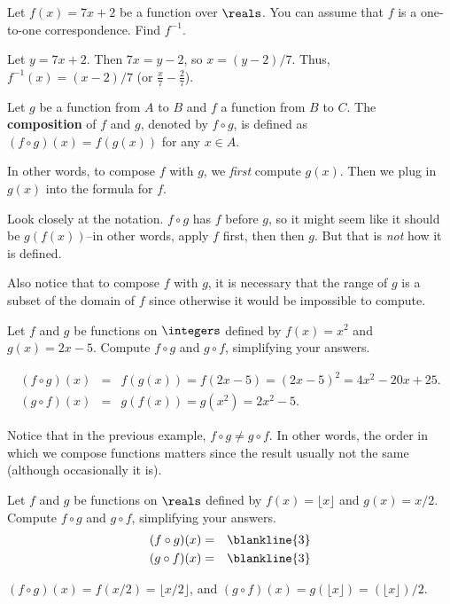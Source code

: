 \begin{exer}
Let $f(x)=7x+2$ be a function over $\reals$. 
You can assume that $f$ is a one-to-one correspondence.
Find $f^{-1}$.
\vspace*{1.25in}
\begin{answer}
Let $y=7x+2$.  Then $7x=y-2$, so $x=(y-2)/7$.  Thus, $f^{-1}(x)=(x-2)/7$
(or $\frac{x}{7}-\frac{2}{7}$).
\end{answer}
\end{exer}

\begin{df}
Let $g$ be a function from $A$ to $B$ and $f$ a function from $B$ to $C$.
The {\bf composition} of $f$ and $g$, denoted by $f\circ g$, is defined as
$(f\circ g)(x)=f(g(x))$ for any $x\in A$.
\end{df}

In other words, to compose $f$ with $g$, we {\em first} compute $g(x)$.  
Then we plug in $g(x)$ into the formula for $f$.

\begin{rem}
Look closely at the notation.  $f\circ g$ has $f$ before $g$, so it might seem like it should be
$g(f(x))$--in other words, apply $f$ first, then then $g$. But that is {\em not} how it is defined.

Also notice that to compose $f$ with $g$, it is necessary that the range of $g$ is a subset of the domain
of $f$ since otherwise it would be impossible to compute.
\end{rem}

\begin{exa}
Let $f$ and $g$ be functions on $\integers$ defined by $f(x)=x^2$ and $g(x)=2x-5$.  Compute
$f\circ g$ and $g\circ f$, simplifying your answers.
\begin{sol}
\begin{eqnarray*}
(f\circ g)(x) &=& f(g(x)) = f(2x-5) = (2x-5)^2 = 4x^2-20x+25.\\
(g\circ f)(x) &=& g(f(x)) = g(x^2) = 2x^2-5.
\end{eqnarray*}
\end{sol}
\end{exa}

Notice that in the previous example, $f\circ g \neq g\circ f$.  In other words, the order in which we
compose functions matters since the result 
usually not the same (although occasionally it is).

\begin{exer}
Let $f$ and $g$ be functions on $\reals$ defined by $f(x)=\lfloor x \rfloor$ and $g(x)=x/2$.  Compute
$f\circ g$ and $g\circ f$, simplifying your answers.
\begin{eqnarray*}
(f\circ g)(x) &=& \blankline{3}\\
(g\circ f)(x) &=& \blankline{3}
\end{eqnarray*}
\begin{answer}
$(f\circ g)(x)=f(x/2)=\lfloor x/2\rfloor$, and
$(g\circ f)(x)=g(\lfloor x\rfloor) = (\lfloor x\rfloor)/2$.
\end{answer}
\end{exer}



